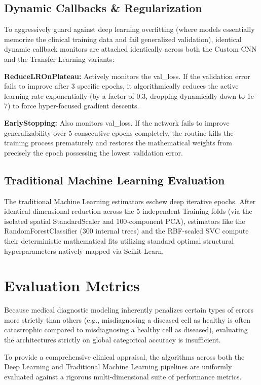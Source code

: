 \subsection{Dynamic Callbacks \& Regularization}

To aggressively guard against deep learning overfitting (where models essentially memorize the clinical training data and fail generalized validation), identical dynamic callback monitors are attached identically across both the Custom CNN and the Transfer Learning variants:

\noindent\textbf{ReduceLROnPlateau:} Actively monitors the val\_loss. If the validation error fails to improve after 3 specific epochs, it algorithmically reduces the active learning rate exponentially (by a factor of 0.3, dropping dynamically down to 1e-7) to force hyper-focused gradient descents.

\noindent\textbf{EarlyStopping:} Also monitors val\_loss. If the network fails to improve generalizability over 5 consecutive epochs completely, the routine kills the training process prematurely and restores the mathematical weights from precisely the epoch possessing the lowest validation error.

\subsection{Traditional Machine Learning Evaluation}

The traditional Machine Learning estimators eschew deep iterative epochs. After identical dimensional reduction across the 5 independent Training folds (via the isolated spatial StandardScaler and 100-component PCA), estimators like the RandomForestClassifier (300 internal trees) and the RBF-scaled SVC compute their deterministic mathematical fits utilizing standard optimal structural hyperparameters natively mapped via Scikit-Learn.

\section{Evaluation Metrics}

Because medical diagnostic modeling inherently penalizes certain types of errors more strictly than others (e.g., misdiagnosing a diseased cell as healthy is often catastrophic compared to misdiagnosing a healthy cell as diseased), evaluating the architectures strictly on global categorical accuracy is insufficient.

To provide a comprehensive clinical appraisal, the algorithms across both the Deep Learning and Traditional Machine Learning pipelines are uniformly evaluated against a rigorous multi-dimensional suite of performance metrics.

